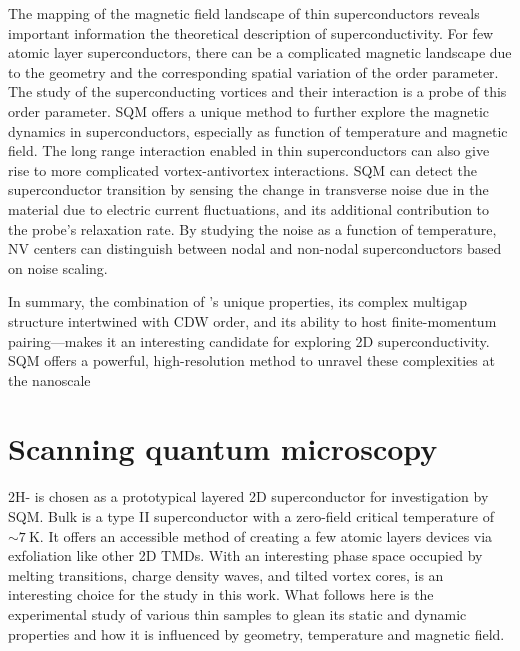The mapping of the magnetic field landscape of thin superconductors reveals important information the theoretical description of superconductivity\cite{clemSimpleModelVortex1975,lembergerPenetrationDepthStudy2007,gubinDependenceMagneticPenetration2005}. For few atomic layer superconductors, there can be a complicated magnetic landscape due to the geometry and the corresponding spatial variation of the order parameter. The study of the superconducting vortices and their interaction is a probe of this order parameter. \gls{SQM} offers a unique method to further explore the magnetic dynamics in superconductors, especially as function of temperature and magnetic field\cite{mongeSpinDynamicsSolidState2023,kolkowitzProbingJohnsonNoise2015,dolgirevCharacterizingTwodimensionalSuperconductivity2022b}. The long range interaction enabled in thin superconductors can also give rise to more complicated vortex-antivortex interactions\cite{beasleyPossibilityVortexAntivortexPair1979,curtisProbingBerezinskiiKosterlitzThoulessVortex2024}. \gls{SQM} can detect the superconductor transition by sensing the change in transverse noise due in the material due to electric current fluctuations, and its additional contribution to the probe's relaxation rate. By studying the noise as a function of temperature, NV centers can distinguish between nodal and non-nodal superconductors based on noise scaling\cite{chatterjeeSinglespinQubitMagnetic2022}.

In summary, the combination of 's unique properties, its complex multigap structure intertwined with CDW order, and its ability to host finite-momentum pairing—makes it an interesting candidate for exploring 2D superconductivity. \gls{SQM} offers a powerful, high-resolution method to unravel these complexities at the nanoscale

\section{Scanning quantum microscopy}

2H- is chosen as a prototypical layered 2D superconductor for investigation by \gls{SQM}. Bulk  is a type II superconductor with a zero-field critical temperature of $\sim\qty{7}{\kelvin}$\cite{xiIsingPairingSuperconducting2016,tanakaMulticomponentSuperconductivityBased2015,zehetmayerExperimentalEvidenceTwoband2010}. It offers an accessible method of creating a few atomic layers devices via exfoliation like other 2D TMDs\cite{dvirSpectroscopyBulkFewlayer2018,songSynthesisAqueousAirstable2023}. With an interesting phase space occupied by melting transitions\cite{guillamonDirectObservationMelting2009}, charge density waves\cite{chikinaTurningChargedensityWaves2020}, and tilted vortex cores\cite{galvisTiltedVortexCores2018},  is an interesting choice for the study in this work. What follows here is the experimental study of various thin  samples to glean its static and dynamic properties and how it is influenced by geometry, temperature and magnetic field.

